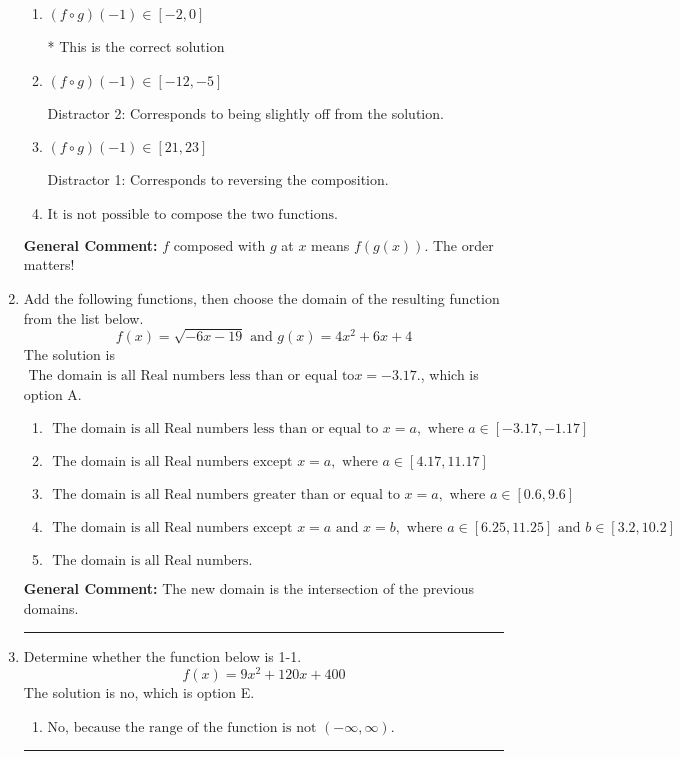 \documentclass{extbook}[14pt]
\newcommand{\litem}[1]{\item #1

\rule{\textwidth}{0.4pt}}
\begin{document}
\begin{enumerate}
{\begin{enumerate}[label=\Alph*.]
 Distractor 3: Corresponds to being slightly off from the solution.
\item \( (f \circ g)(-1) \in [-2, 0] \)

* This is the correct solution
\item \( (f \circ g)(-1) \in [-12, -5] \)

 Distractor 2: Corresponds to being slightly off from the solution.
\item \( (f \circ g)(-1) \in [21, 23] \)

 Distractor 1: Corresponds to reversing the composition.
\item \( \text{It is not possible to compose the two functions.} \)


\end{enumerate}

\textbf{General Comment:} $f$ composed with $g$ at $x$ means $f(g(x))$. The order matters!
}
\litem{
Add the following functions, then choose the domain of the resulting function from the list below.
\[ f(x) = \sqrt{-6x-19}  \text{ and } g(x) = 4x^{2} +6 x + 4 \]The solution is \( \text{ The domain is all Real numbers less than or equal to} x = -3.17. \), which is option A.\begin{enumerate}[label=\Alph*.]
\item \( \text{ The domain is all Real numbers less than or equal to } x = a, \text{ where } a \in [-3.17, -1.17] \)


\item \( \text{ The domain is all Real numbers except } x = a, \text{ where } a \in [4.17, 11.17] \)


\item \( \text{ The domain is all Real numbers greater than or equal to } x = a, \text{ where } a \in [0.6, 9.6] \)


\item \( \text{ The domain is all Real numbers except } x = a \text{ and } x = b, \text{ where } a \in [6.25, 11.25] \text{ and } b \in [3.2, 10.2] \)


\item \( \text{ The domain is all Real numbers. } \)


\end{enumerate}

\textbf{General Comment:} The new domain is the intersection of the previous domains.
}
\litem{
Determine whether the function below is 1-1.
\[ f(x) = 9 x^2 + 120 x + 400 \]The solution is \( \text{no} \), which is option E.\begin{enumerate}[label=\Alph*.]
\item \( \text{No, because the range of the function is not $(-\infty, \infty)$.} \)


\end{enumerate}}
\end{enumerate}
\end{document}

